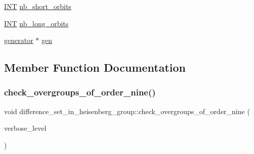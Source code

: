 \begin{DoxyCompactItemize}
\item 
\mbox{\hyperlink{galois_8h_a09fddde158a3a20bd2dcadb609de11dc}{I\+NT}} \mbox{\hyperlink{classdifference__set__in__heisenberg__group_ac69eb116d045c55a64e14217527bc85e}{nb\+\_\+short\+\_\+orbits}}
\item 
\mbox{\hyperlink{galois_8h_a09fddde158a3a20bd2dcadb609de11dc}{I\+NT}} \mbox{\hyperlink{classdifference__set__in__heisenberg__group_a180aae62b557d7afdd461a5bbf970268}{nb\+\_\+long\+\_\+orbits}}
\item 
\mbox{\hyperlink{classgenerator}{generator}} $\ast$ \mbox{\hyperlink{classdifference__set__in__heisenberg__group_a33261922e06cdcdd6472f5d5fad24758}{gen}}
\end{DoxyCompactItemize}


\subsection{Member Function Documentation}
\mbox{\label{classdifference__set__in__heisenberg__group_af7075193cf272d5b63356e21ec1ab8a8}} 
\subsubsection{\texorpdfstring{check\+\_\+overgroups\+\_\+of\+\_\+order\+\_\+nine()}{check\_overgroups\_of\_order\_nine()}}
{\footnotesize\ttfamily void difference\+\_\+set\+\_\+in\+\_\+heisenberg\+\_\+group\+::check\+\_\+overgroups\+\_\+of\+\_\+order\+\_\+nine (\begin{DoxyParamCaption}\item[{\mbox{\hyperlink{galois_8h_a09fddde158a3a20bd2dcadb609de11dc}{I\+NT}}}]{verbose\+\_\+level }\end{DoxyParamCaption})}

\mbox{\label{classdifference__set__in__heisenberg__group_a9bde5ad5da3ebaebf98fbfd3e8110b79}} 
